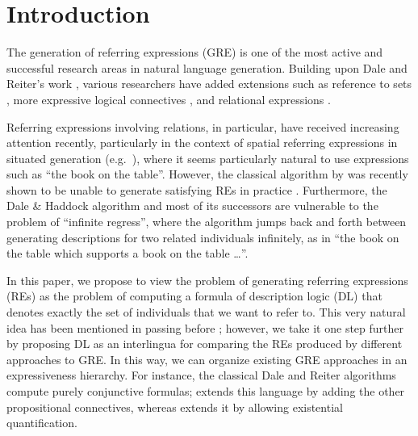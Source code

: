 \section{Introduction} \label{sec:introduction}

The generation of referring expressions (GRE) is one of the most
active and successful research areas in natural language generation.
Building upon Dale and Reiter's work \cite{dale89cooking,Dale1995},
various researchers have added extensions such as reference to sets
\cite{Stone2000}, more expressive logical connectives
\cite{deemter01:_gener_refer_expres}, and relational expressions
\cite{dale91:_gener_refer_expres_invol_relat}.

Referring expressions involving relations, in particular, have
received increasing attention recently, particularly in the context of
spatial referring expressions in situated generation (e.g.\
\cite{kelleher06:_increm_gener_of_spatial_refer}), where it seems
particularly natural to use expressions such as ``the book on the
table''.  However, the classical algorithm by
 was recently shown to
be unable to generate satisfying REs in practice
\cite{viethen06:_algor_for_gener_refer_expres}.  Furthermore, the Dale
\& Haddock algorithm and most of its successors
\cite{Krahmer2003,kelleher06:_increm_gener_of_spatial_refer} are
vulnerable to the problem of ``infinite regress'', where the algorithm
jumps back and forth between generating descriptions for two related
individuals infinitely, as in ``the book on the table which supports a
book on the table \ldots''.

In this paper, we propose to view the problem of generating referring
expressions (REs) as the problem of computing a formula of description
logic (DL) that denotes exactly the set of individuals that we want to
refer to.  This very natural idea has been mentioned in passing before
\cite{Krahmer2003,gardent07:_gener_bridg_defin_descr}; however, we
take it one step further by proposing DL as an interlingua for
comparing the REs produced by different approaches to GRE.  In this
way, we can organize existing GRE approaches in an expressiveness
hierarchy.  For instance, the classical Dale and Reiter algorithms
compute purely conjunctive formulas;
 extends this language by
adding the other propositional connectives, whereas
 extends it by
allowing existential quantification.

